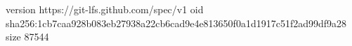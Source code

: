 version https://git-lfs.github.com/spec/v1
oid sha256:1cb7caa928b083eb27938a22cb6cad9e4e813650f0a1d1917c51f2ad99df9a28
size 87544
